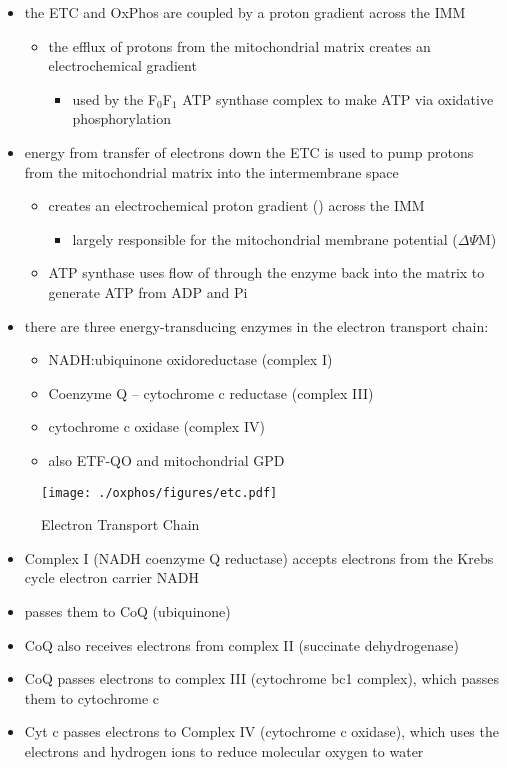 \documentclass{scrartcl}
\begin{document}
\begin{itemize}
\item the ETC and OxPhos are coupled by a proton gradient across the IMM
\begin{itemize}
\item the efflux of protons from the mitochondrial matrix creates an electrochemical gradient
\begin{itemize}
\item used by the F\(_{\text{0}}\)F\(_{\text{1}}\) ATP synthase complex to make ATP via oxidative phosphorylation
\end{itemize}
\end{itemize}
\item energy from transfer of electrons down the ETC is used to pump
protons from the mitochondrial matrix into the intermembrane space
\begin{itemize}
\item creates an electrochemical proton gradient (\DeltapH) across the IMM
\begin{itemize}
\item largely responsible for the mitochondrial membrane potential (\(\Delta \Psi\)M)
\end{itemize}
\item ATP synthase uses flow of  through the enzyme back into the
matrix to generate ATP from ADP and Pi
\end{itemize}
\item there are three energy-transducing enzymes in the electron transport
chain:
\begin{itemize}
\item NADH:ubiquinone oxidoreductase (complex I)
\item Coenzyme Q – cytochrome c reductase (complex III)
\item cytochrome c oxidase (complex IV)
\item also ETF-QO and mitochondrial GPD
\end{itemize}
\end{itemize}

\begin{figure}[htbp]
\centering
\texttt{[image: ./oxphos/figures/etc.pdf]}
\caption{\label{fig:org387132f}
Electron Transport Chain}
\end{figure}

\begin{itemize}
\item Complex I (NADH coenzyme Q reductase) accepts electrons from the
Krebs cycle electron carrier NADH
\item passes them to CoQ (ubiquinone)
\item CoQ also receives electrons from complex II (succinate dehydrogenase)
\item CoQ passes electrons to complex III (cytochrome bc1 complex), which
passes them to cytochrome c
\item Cyt c passes electrons to Complex IV (cytochrome c oxidase), which
uses the electrons and hydrogen ions to reduce molecular oxygen to
water
\end{itemize}
\end{document}
